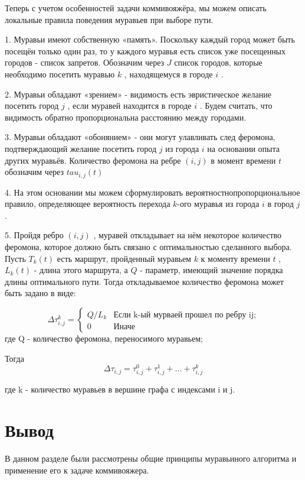 \documentclass[12pt]{report}
\begin{document}
Теперь с учетом особенностей задачи коммивояжёра, мы можем описать локальные правила поведения муравьев при выборе пути.\

1. Муравьи имеют собственную «память». Поскольку каждый город может быть посещён только один раз, то у каждого муравья есть список уже посещенных городов - список запретов. Обозначим через $J$ список городов, которые необходимо посетить муравью $k$ , находящемуся в городе $i$ . 

2. Муравьи обладают «зрением» - видимость есть эвристическое желание посетить город $j$ , если муравей находится в городе $i$ . Будем считать, что видимость обратно пропорциональна расстоянию между городами. 

3. Муравьи обладают «обонянием» - они могут улавливать след феромона, подтверждающий желание посетить город $j$ из города $i$ на основании опыта других муравьёв. Количество феромона на ребре $(i,j)$ в момент времени $t$ обозначим через  $tau _{i,j} (t)$ 

4. На этом основании мы можем сформулировать вероятностнопропорциональное правило, определяющее вероятность перехода $k$-ого муравья из города $i$  в город $j$. 

5. Пройдя ребро $(i,j)$ , муравей откладывает на нём некоторое количество феромона, которое должно быть связано с оптимальностью сделанного выбора. Пусть $T _{k} (t)$ есть маршрут, пройденный муравьем $k$ к моменту времени $t$ , $L _{k} (t)$ - длина этого маршрута, а $Q$ - параметр, имеющий значение порядка длины оптимального пути. Тогда откладываемое количество феромона может быть задано в виде:

\begin{equation}\label{form:add} 
	{\displaystyle \Delta \tau _{i,j}^k={\begin{cases}Q/L_{k}& {\mbox{Если k-ый мурваей прошел по ребру ij;}}\\0&{\mbox{Иначе}}\end{cases}}}
\end{equation}
где \quad Q - количество феромона, переносимого муравьем;

Тогда
\begin{equation}\label{form:add1} 
	\Delta \tau _{i,j}= \tau _{i,j}^0 + \tau _{i,j}^1 + ... + \tau _{i,j}^k 
\end{equation}

где k - количество муравьев в вершине графа с индексами i и j.


\section*{Вывод}
В данном разделе были рассмотрены общие принципы муравьиного алгоритма и применение его к задаче коммивояжера. 
\end{document}
